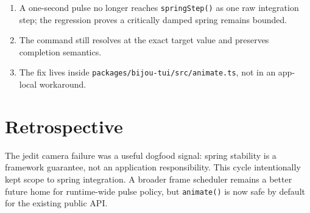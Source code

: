 \begin{enumerate}
\def\labelenumi{\arabic{enumi}.}
\tightlist
\item
  A one-second pulse no longer reaches \texttt{s\allowbreak{}p\allowbreak{}r\allowbreak{}i\allowbreak{}n\allowbreak{}g\allowbreak{}S\allowbreak{}t\allowbreak{}e\allowbreak{}p\allowbreak{}(\allowbreak{})} as one raw integration step; the regression proves a critically damped spring remains bounded.
\item
  The command still resolves at the exact target value and preserves completion semantics.
\item
  The fix lives inside \texttt{p\allowbreak{}a\allowbreak{}c\allowbreak{}k\allowbreak{}a\allowbreak{}g\allowbreak{}e\allowbreak{}s\allowbreak{}/\allowbreak{}b\allowbreak{}i\allowbreak{}j\allowbreak{}o\allowbreak{}u\allowbreak{}-\allowbreak{}t\allowbreak{}u\allowbreak{}i\allowbreak{}/\allowbreak{}s\allowbreak{}r\allowbreak{}c\allowbreak{}/\allowbreak{}a\allowbreak{}n\allowbreak{}i\allowbreak{}m\allowbreak{}a\allowbreak{}t\allowbreak{}e\allowbreak{}.\allowbreak{}t\allowbreak{}s}, not in an app-local workaround.
\end{enumerate}

\section{Retrospective}\label{record-161-retrospective}

The jedit camera failure was a useful dogfood signal: spring stability is a framework guarantee, not an application responsibility. This cycle intentionally kept scope to spring integration. A broader frame scheduler remains a better future home for runtime-wide pulse policy, but \texttt{a\allowbreak{}n\allowbreak{}i\allowbreak{}m\allowbreak{}a\allowbreak{}t\allowbreak{}e\allowbreak{}(\allowbreak{})} is now safe by default for the existing public API.

